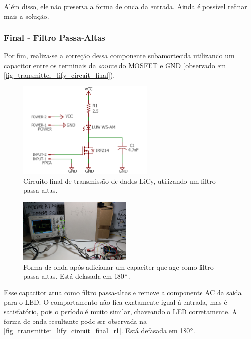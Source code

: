 	Além disso, ele não preserva a forma de onda da entrada. Ainda é possível refinar mais a solução.
	
	\subsubsection{Final - Filtro Passa-Altas}
	Por fim, realiza-se a correção dessa componente subamortecida utilizando um capacitor entre os terminais da \textit{source} do MOSFET e GND (observado em \autoref{fig_transmitter_lify_circuit_final}). 
	\begin{figure}[h!]
		\caption{\label{fig_transmitter_lify_circuit_final}Circuito final de transmissão de dados LiCy, utilizando um filtro passa-altas.}
		\centering
		\includegraphics[width=0.6\textwidth, trim={2cm 0cm 2cm 0cm}, clip]{circuits/transmitter_lify.pdf}
	\end{figure}
	
	\begin{figure}[h!]
		\caption{\label{fig_transmitter_lify_circuit_final_r1} Forma de onda após adicionar um capacitor que age como filtro passa-altas. Está defasada em 180$\degree$. }
		\centering
		\includegraphics[width=0.5\textwidth, trim={10cm 35cm 97cm 22cm}, clip]{circuits/photos/TX_200k_with_filter.jpeg}
	\end{figure}
	Esse capacitor atua como filtro passa-altas e remove a componente AC da saída para o LED. O comportamento não fica exatamente igual à entrada, mas é satisfatório, pois o período é muito similar, chaveando o LED corretamente. A forma de onda resultante pode ser observada na \autoref{fig_transmitter_lify_circuit_final_r1}. Está defasada em 180$\degree$.

